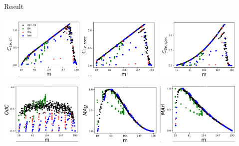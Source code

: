 \documentclass{beamer}
\begin{document}
    \begin{frame}{Result}
        \begin{multicols}{3}
            \centering
            \includegraphics[width=0.3\textwidth,height=0.3\textheight,keepaspectratio]{1.png}
            \includegraphics[width=0.3\textwidth,height=0.3\textheight,keepaspectratio]{2.png}
            \includegraphics[width=0.3\textwidth,height=0.3\textheight,keepaspectratio]{3.png}
        \end{multicols}
        \begin{multicols}{3}
            \centering
            \includegraphics[width=0.3\textwidth,height=0.3\textheight,keepaspectratio]{4.png}
            \includegraphics[width=0.3\textwidth,height=0.3\textheight,keepaspectratio]{5.png}
            \includegraphics[width=0.3\textwidth,height=0.3\textheight,keepaspectratio]{6.png}

\end{multicols}
\end{frame}
\end{document}
